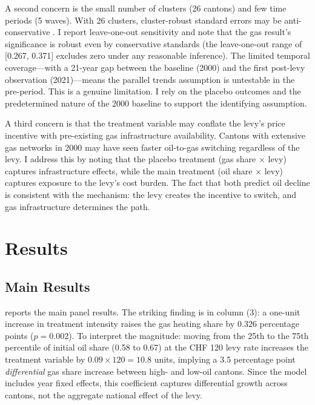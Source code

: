\documentclass[12pt]{article}
\begin{document}
A second concern is the small number of clusters (26 cantons) and few time periods (5 waves). With 26 clusters, cluster-robust standard errors may be anti-conservative \citep{cameron2008}. I report leave-one-out sensitivity and note that the gas result's significance is robust even by conservative standards (the leave-one-out range of [0.267, 0.371] excludes zero under any reasonable inference). The limited temporal coverage---with a 21-year gap between the baseline (2000) and the first post-levy observation (2021)---means the parallel trends assumption is untestable in the pre-period. This is a genuine limitation. I rely on the placebo outcomes and the predetermined nature of the 2000 baseline to support the identifying assumption.

A third concern is that the treatment variable may conflate the levy's price incentive with pre-existing gas infrastructure availability. Cantons with extensive gas networks in 2000 may have seen faster oil-to-gas switching regardless of the levy. I address this by noting that the placebo treatment (gas share $\times$ levy) captures infrastructure effects, while the main treatment (oil share $\times$ levy) captures exposure to the levy's cost burden. The fact that both predict oil decline is consistent with the mechanism: the levy creates the incentive to switch, and gas infrastructure determines the path.


\section{Results}
\label{sec:results}

\subsection{Main Results}

 reports the main panel results. The striking finding is in column (3): a one-unit increase in treatment intensity raises the gas heating share by 0.326 percentage points ($p = 0.002$). To interpret the magnitude: moving from the 25th to the 75th percentile of initial oil share (0.58 to 0.67) at the CHF 120 levy rate increases the treatment variable by $0.09 \times 120 = 10.8$ units, implying a 3.5 percentage point \textit{differential} gas share increase between high- and low-oil cantons. Since the model includes year fixed effects, this coefficient captures differential growth across cantons, not the aggregate national effect of the levy.
\end{document}
